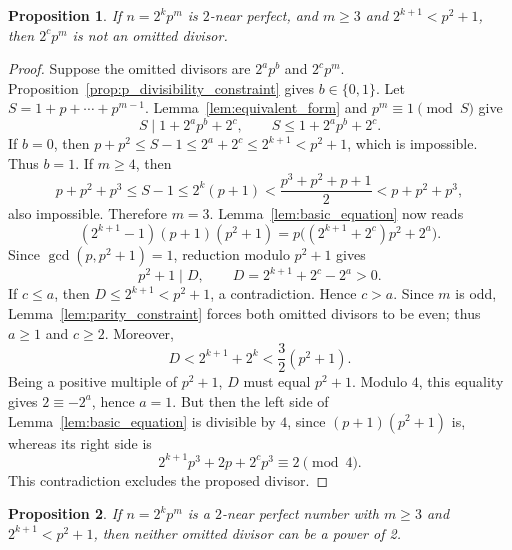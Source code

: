 \documentclass[10pt]{article}
\newtheorem{proposition}{Proposition}
\theoremstyle{definition}
\begin{document}
\begin{proposition}\label{prop:no_pm_divisor}
    If $n=2^kp^m$ is $2$-near perfect, and $m\ge3$ and $2^{k+1}<p^2+1$, then $2^cp^m$ is not an omitted divisor.
\end{proposition}

\begin{proof}
Suppose the omitted divisors are $2^ap^b$ and $2^cp^m$.
Proposition~\ref{prop:p_divisibility_constraint} gives $b\in\{0,1\}$.
Let $S=1+p+\cdots+p^{m-1}$. Lemma~\ref{lem:equivalent_form}
and $p^m\equiv1\pmod S$ give
\[
S\mid1+2^ap^b+2^c,
\qquad S\le1+2^ap^b+2^c.
\]
If $b=0$, then $p+p^2\le S-1\le2^a+2^c\le2^{k+1}<p^2+1$,
which is impossible. Thus $b=1$.
If $m\ge4$, then
\[
p+p^2+p^3\le S-1\le2^k(p+1)
<\frac{p^3+p^2+p+1}{2}<p+p^2+p^3,
\]
also impossible. Therefore $m=3$. Lemma~\ref{lem:basic_equation} now reads
\[
(2^{k+1}-1)(p+1)(p^2+1)
=p\bigl((2^{k+1}+2^c)p^2+2^a\bigr).
\]
Since $\gcd(p,p^2+1)=1$, reduction modulo $p^2+1$ gives
\[
p^2+1\mid D,\qquad D=2^{k+1}+2^c-2^a>0.
\]
If $c\le a$, then $D\le2^{k+1}<p^2+1$, a contradiction.
Hence $c>a$. Since $m$ is odd, Lemma~\ref{lem:parity_constraint}
forces both omitted divisors to be even; thus $a\ge1$ and $c\ge2$.
Moreover,
\[
D<2^{k+1}+2^k<\frac32(p^2+1).
\]
Being a positive multiple of $p^2+1$, $D$ must equal $p^2+1$.
Modulo $4$, this equality gives $2\equiv-2^a$, hence $a=1$.
But then the left side of Lemma~\ref{lem:basic_equation} is divisible
by $4$, since $(p+1)(p^2+1)$ is, whereas its right side is
\[
2^{k+1}p^3+2p+2^cp^3\equiv2\pmod4.
\]
This contradiction excludes the proposed divisor.
\end{proof}

\begin{proposition}\label{prop:no_power_of_2_divisor}
    If $n=2^kp^m$ is a $2$-near perfect number with $m \ge 3$ and $2^{k+1} < p^2+1$, then neither omitted divisor can be a power of 2.
\end{proposition}
\end{document}
